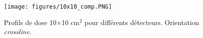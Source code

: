\documentclass{book}
\begin{document}

\begin{figure}[h]
  \centering
  \texttt{[image: figures/10x10\_comp.PNG]}
  \caption{Profils de dose 10$\times$10 cm$^2$ pour différents détecteurs. Orientation \textit{crossline}.}
  \label{fig_profils_10x10}
\end{figure}
\end{document}

